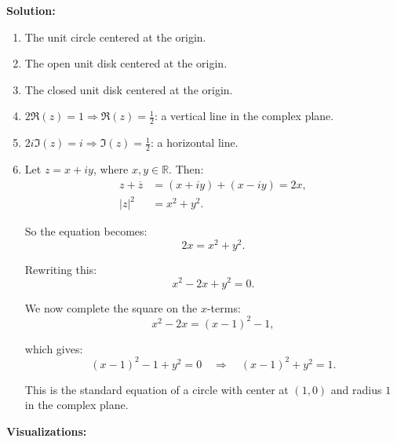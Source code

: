 \textbf{Solution:}
\begin{enumerate}[label=\alph*)]
\item The unit circle centered at the origin.
\item The open unit disk centered at the origin.
\item The closed unit disk centered at the origin.
\item \( 2 \Re(z) = 1 \Rightarrow \Re(z) = \frac{1}{2} \): a vertical line in the complex plane.
\item \( 2i \Im(z) = i \Rightarrow \Im(z) = \frac{1}{2} \): a horizontal line.
\item Let \( z = x + iy \), where \( x, y \in \mathbb{R} \). Then:
\begin{align*}
z + \overline{z} &= (x + iy) + (x - iy) = 2x, \\
|z|^2 &= x^2 + y^2.
\end{align*}

So the equation becomes:
\[
2x = x^2 + y^2.
\]

Rewriting this:
\[
x^2 - 2x + y^2 = 0.
\]

We now complete the square on the \( x \)-terms:
\[
x^2 - 2x = (x - 1)^2 - 1,
\]

which gives:
\[
(x - 1)^2 - 1 + y^2 = 0 \quad \Rightarrow \quad (x - 1)^2 + y^2 = 1.
\]

This is the standard equation of a circle with center at \( (1, 0) \) and radius \( 1 \) in the complex plane.

\end{enumerate}

\textbf{Visualizations:}


